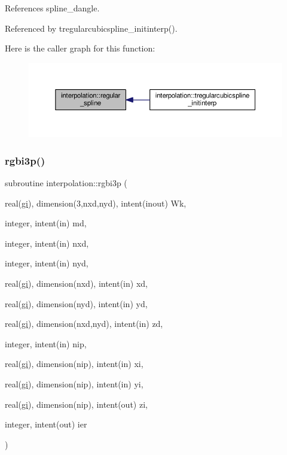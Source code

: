 References spline\+\_\+dangle.



Referenced by tregularcubicspline\+\_\+initinterp().

Here is the caller graph for this function\+:
\nopagebreak
\begin{figure}[H]
\begin{center}
\leavevmode
\includegraphics[width=350pt]{namespaceinterpolation_a2864cd829f018329811e906e0b258b6c_icgraph}
\end{center}
\end{figure}
\mbox{\label{namespaceinterpolation_a44b1a5e85b19c58f04e2f7e3483cbb3f}} 
\subsubsection{\texorpdfstring{rgbi3p()}{rgbi3p()}}
{\footnotesize\ttfamily subroutine interpolation\+::rgbi3p (\begin{DoxyParamCaption}\item[{real(\mbox{\hyperlink{namespaceinterpolation_a7242dea48715e8170bae81efe12c64be}{gi}}), dimension(3,nxd,nyd), intent(inout)}]{Wk,  }\item[{integer, intent(in)}]{md,  }\item[{integer, intent(in)}]{nxd,  }\item[{integer, intent(in)}]{nyd,  }\item[{real(\mbox{\hyperlink{namespaceinterpolation_a7242dea48715e8170bae81efe12c64be}{gi}}), dimension(nxd), intent(in)}]{xd,  }\item[{real(\mbox{\hyperlink{namespaceinterpolation_a7242dea48715e8170bae81efe12c64be}{gi}}), dimension(nyd), intent(in)}]{yd,  }\item[{real(\mbox{\hyperlink{namespaceinterpolation_a7242dea48715e8170bae81efe12c64be}{gi}}), dimension(nxd,nyd), intent(in)}]{zd,  }\item[{integer, intent(in)}]{nip,  }\item[{real(\mbox{\hyperlink{namespaceinterpolation_a7242dea48715e8170bae81efe12c64be}{gi}}), dimension(nip), intent(in)}]{xi,  }\item[{real(\mbox{\hyperlink{namespaceinterpolation_a7242dea48715e8170bae81efe12c64be}{gi}}), dimension(nip), intent(in)}]{yi,  }\item[{real(\mbox{\hyperlink{namespaceinterpolation_a7242dea48715e8170bae81efe12c64be}{gi}}), dimension(nip), intent(out)}]{zi,  }\item[{integer, intent(out)}]{ier }\end{DoxyParamCaption})}



